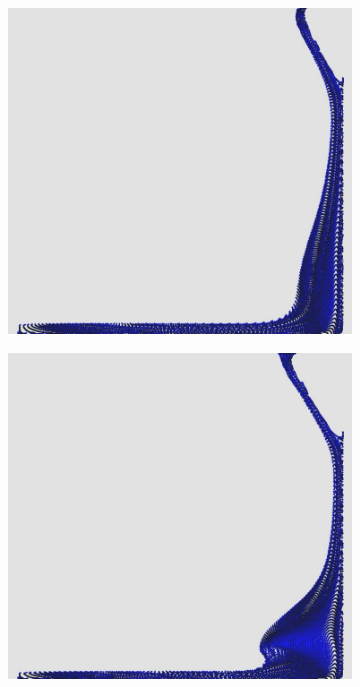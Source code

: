 \documentclass[12pt,a4paper,dvipsnames]{article}
\begin{document}
\begin{figure}[!ht]
\begin{subfigure}[!h]{0.3\textwidth}
	\end{subfigure}
	\begin{subfigure}[!h]{0.3\textwidth} \centering
		\includegraphics[width=\textwidth]{VDB/VDB-07.jpg}
	\end{subfigure}
	\begin{subfigure}[!h]{0.3\textwidth} \centering
		\includegraphics[width=\textwidth]{VDB/VDB-08.jpg}

\end{subfigure}
\end{figure}
\end{document}
